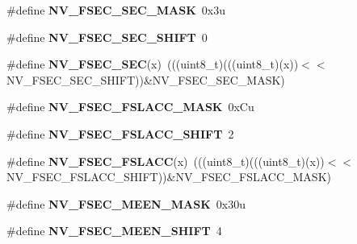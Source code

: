 \begin{DoxyCompactItemize}
\item 
\#define {\bfseries N\+V\+\_\+\+F\+S\+E\+C\+\_\+\+S\+E\+C\+\_\+\+M\+A\+SK}~0x3u\hypertarget{group__NV__Register__Masks_gab159c721c6cde1f629b630c573da8ea9}{}\label{group__NV__Register__Masks_gab159c721c6cde1f629b630c573da8ea9}

\item 
\#define {\bfseries N\+V\+\_\+\+F\+S\+E\+C\+\_\+\+S\+E\+C\+\_\+\+S\+H\+I\+FT}~0\hypertarget{group__NV__Register__Masks_ga92a819b24b0472a83857ddd2d950ab08}{}\label{group__NV__Register__Masks_ga92a819b24b0472a83857ddd2d950ab08}

\item 
\#define {\bfseries N\+V\+\_\+\+F\+S\+E\+C\+\_\+\+S\+EC}(x)~(((uint8\+\_\+t)(((uint8\+\_\+t)(x))$<$$<$N\+V\+\_\+\+F\+S\+E\+C\+\_\+\+S\+E\+C\+\_\+\+S\+H\+I\+FT))\&N\+V\+\_\+\+F\+S\+E\+C\+\_\+\+S\+E\+C\+\_\+\+M\+A\+SK)\hypertarget{group__NV__Register__Masks_ga285ae0f5ea99f97dfae69dc7affebcde}{}\label{group__NV__Register__Masks_ga285ae0f5ea99f97dfae69dc7affebcde}

\item 
\#define {\bfseries N\+V\+\_\+\+F\+S\+E\+C\+\_\+\+F\+S\+L\+A\+C\+C\+\_\+\+M\+A\+SK}~0x\+Cu\hypertarget{group__NV__Register__Masks_ga8fd3b6696c82aa96017fe25be34d19c9}{}\label{group__NV__Register__Masks_ga8fd3b6696c82aa96017fe25be34d19c9}

\item 
\#define {\bfseries N\+V\+\_\+\+F\+S\+E\+C\+\_\+\+F\+S\+L\+A\+C\+C\+\_\+\+S\+H\+I\+FT}~2\hypertarget{group__NV__Register__Masks_gaba549ee99b8ca1af3531eafd5746f6b6}{}\label{group__NV__Register__Masks_gaba549ee99b8ca1af3531eafd5746f6b6}

\item 
\#define {\bfseries N\+V\+\_\+\+F\+S\+E\+C\+\_\+\+F\+S\+L\+A\+CC}(x)~(((uint8\+\_\+t)(((uint8\+\_\+t)(x))$<$$<$N\+V\+\_\+\+F\+S\+E\+C\+\_\+\+F\+S\+L\+A\+C\+C\+\_\+\+S\+H\+I\+FT))\&N\+V\+\_\+\+F\+S\+E\+C\+\_\+\+F\+S\+L\+A\+C\+C\+\_\+\+M\+A\+SK)\hypertarget{group__NV__Register__Masks_ga75d524350a710ba87a95c927466a42d2}{}\label{group__NV__Register__Masks_ga75d524350a710ba87a95c927466a42d2}

\item 
\#define {\bfseries N\+V\+\_\+\+F\+S\+E\+C\+\_\+\+M\+E\+E\+N\+\_\+\+M\+A\+SK}~0x30u\hypertarget{group__NV__Register__Masks_ga02f5aa86e1f5bceefd0378fa736d5656}{}\label{group__NV__Register__Masks_ga02f5aa86e1f5bceefd0378fa736d5656}

\item 
\#define {\bfseries N\+V\+\_\+\+F\+S\+E\+C\+\_\+\+M\+E\+E\+N\+\_\+\+S\+H\+I\+FT}~4\hypertarget{group__NV__Register__Masks_ga13adfbdf46af9e59b446d17ce90b49c1}{}\label{group__NV__Register__Masks_ga13adfbdf46af9e59b446d17ce90b49c1}


\end{DoxyCompactItemize}
